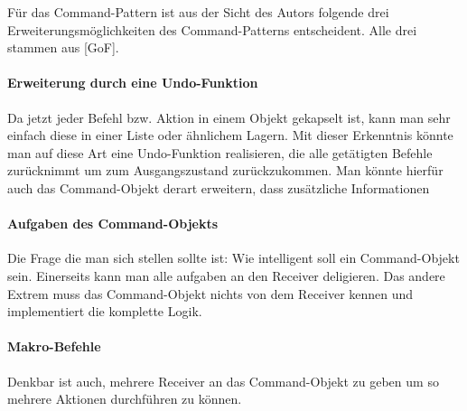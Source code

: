 Für das Command-Pattern ist aus der Sicht des Autors folgende drei Erweiterungsmöglichkeiten des Command-Patterns entscheident. Alle drei stammen aus [GoF]. 

\paragraph{Erweiterung durch eine Undo-Funktion} Da jetzt jeder Befehl bzw. Aktion in einem Objekt gekapselt ist, kann man sehr einfach diese in einer Liste oder ähnlichem Lagern. Mit dieser Erkenntnis könnte man auf diese Art eine Undo-Funktion realisieren, die alle getätigten Befehle zurücknimmt um zum Ausgangszustand zurückzukommen. Man könnte hierfür auch das Command-Objekt derart erweitern, dass zusätzliche Informationen

\paragraph{Aufgaben des Command-Objekts} Die Frage die man sich stellen sollte ist: Wie intelligent soll ein Command-Objekt sein. Einerseits kann man alle aufgaben an den Receiver deligieren. Das andere Extrem muss das Command-Objekt nichts von dem Receiver kennen und implementiert die komplette Logik.

\paragraph{Makro-Befehle} Denkbar ist auch, mehrere Receiver an das Command-Objekt zu geben um so mehrere Aktionen durchführen zu können.


